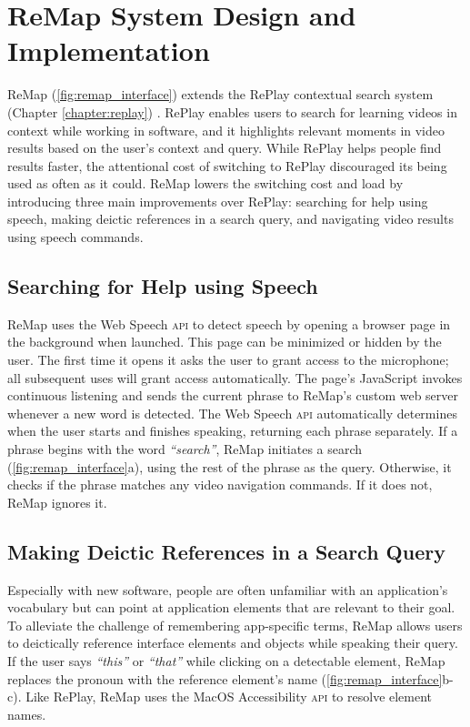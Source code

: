 \section{ReMap System Design and Implementation}
ReMap (\autoref{fig:remap_interface}) extends the RePlay contextual search system (Chapter \ref{chapter:replay}) . RePlay enables users to search for learning videos in context while working in software, and it highlights relevant moments in video results based on the user's context and query. While RePlay helps people find results faster, the attentional cost of switching to RePlay discouraged its being used as often as it could. ReMap lowers the switching cost and load by introducing three main improvements over RePlay: searching for help using speech, making deictic references in a search query, and navigating video results using speech commands.

\subsection{Searching for Help using Speech}
ReMap uses the Web Speech \textsc{api} to detect speech by opening a browser page in the background when launched. This page can be minimized or hidden by the user. The first time it opens it asks the user to grant access to the microphone; all subsequent uses will grant access automatically. The page's JavaScript invokes continuous listening and sends the current phrase to ReMap's custom web server whenever a new word is detected.
The Web Speech \textsc{api} automatically determines when the user starts and finishes speaking, returning each phrase separately. If a phrase begins with the word \textit{``search''}, ReMap initiates a search (\autoref{fig:remap_interface}a), using the rest of the phrase as the query. Otherwise, it checks if the phrase matches any video navigation commands. If it does not, ReMap ignores it.

\subsection{Making Deictic References in a Search Query}
Especially with new software, people are often unfamiliar with an application's vocabulary but can point at application elements that are relevant to their goal. 
To alleviate the challenge of remembering app-specific terms, ReMap allows users to deictically reference interface elements and objects while speaking their query. If the user says \textit{``this''} or \textit{``that''} while clicking on a detectable element, ReMap replaces the pronoun with the reference element's name (\autoref{fig:remap_interface}b-c). Like RePlay, ReMap uses the MacOS Accessibility \textsc{api} to resolve element names. 

